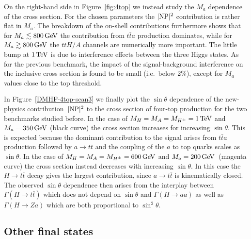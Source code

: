 \documentclass[a4paper, 11pt,notoc]{article}
\newcommand{\mA}{\ensuremath{M_{A}}\xspace}
\newcommand{\ma}{\ensuremath{M_{a}}\xspace}
\newcommand{\mH}{\ensuremath{M_{H}}\xspace}
\newcommand{\mHc}{\ensuremath{M_{H^{\pm}}}\xspace}
\begin{document}
On the right-hand side in Figure~\ref{fig:4top} we instead  study the $\ma$ dependence of the cross section. For the chosen parameters the $|{\rm NP}|^2$ contribution is rather flat in $\ma$. The breakdown of the on-shell contributions furthermore shows that for $\ma \lesssim 800 \, {\rm GeV}$ the contribution from $t \bar t a$ production dominates, while for $\ma \gtrsim 800 \, {\rm GeV}$ the $t \bar t H/A$ channels are numerically more important. The little bump at $1 \, {\rm TeV}$ is due to interference effects between the three Higgs states.  As for the previous benchmark,  the impact of the signal-background interference on the inclusive cross section is found to be small (i.e.~below 2\%), except for $\ma$ values close to the top threshold. 

In Figure~\ref{DMHF-4top-scan3} we finally plot the  $\sin \theta$ dependence of the new-physics contribution~$|{\rm NP}|^2$ to the cross section of four-top production for the two benchmarks studied before. 
In the case of $\mH =\mA=\mHc = 1 \, {\rm TeV}$ and $\ma = 350 \, {\rm GeV}$ (black curve) the cross section  increases for increasing $\sin \theta$. This is expected because the dominant contribution to the signal arises from $t \bar t  a$ production followed by $a \to t \bar t$ and the coupling of the $a$ to top quarks scales as $\sin \theta$. In the case of $\mH =\mA=\mHc = 600 \, {\rm GeV}$ and $\ma = 200 \, {\rm GeV}$~(magenta curve) the cross section instead decreases with increasing $\sin \theta$.  In this case  the $H \to t \bar t$ decay gives the largest  contribution, since $a \to t \bar t$ is kinematically closed. The observed $\sin \theta$ dependence then arises from the interplay between $\Gamma (H \to t \bar t)$ which does not depend on $\sin \theta$ and $\Gamma (H \to aa)$ as well as $\Gamma (H \to Za)$ which are both proportional to $\sin^2 \theta$.
 
\subsection{Other final states}
\label{sec:others}
\end{document}

